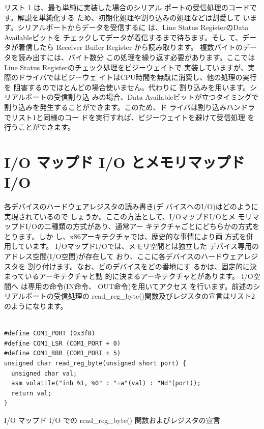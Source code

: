  リスト 1 は、最も単純に実装した場合のシリアル
ポートの受信処理のコードです。解説を単純化する
ため、初期化処理や割り込みの処理などは割愛して
います。シリアルポートからデータを受信するに
は、Line Status RegisterのData Availableビットを
チェックしてデータが着信するまで待ちます。そし
て、データが着信したら Receiver Buffer Register
から読み取ります。
 複数バイトのデータを読み出すには、バイト数分
この処理を繰り返す必要があります。ここではLine
Status Registerのチェック処理をビジーウェイトで
実装していますが、実際のドライバではビジーウェ
イトはCPU時間を無駄に消費し、他の処理の実行を
阻害するのでほとんどの場合使いません。代わりに
割り込みを用います。シリアルポートの受信割り込
みの場合、Data Availableビットが立つタイミングで
割り込みを発生することができます。このため、ド
ライバは割り込みハンドラでリスト1と同様のコー
ドを実行すれば、ビジーウェイトを避けて受信処理
を行うことができます。



\section{I/O マップド I/O とメモリマップド I/O}

 各デバイスのハードウェアレジスタの読み書き(デ
バイスへのI/O)はどのように実現されているので
しょうか。ここの方法として、I/OマップドI/Oとメ
モリマップドI/Oの二種類の方式があり、通常アー
キテクチャごとにどちらかの方式をとります。しか
し、x86アーキテクチャでは、歴史的な事情により両
方式を併用しています。
 I/OマップドI/Oでは、メモリ空間とは独立した
デバイス専用のアドレス空間(I/O空間)が存在して
おり、ここに各デバイスのハードウェアレジスタを
割り付けます。なお、どのデバイスをどの番地にす
るかは、固定的に決まっているアーキテクチャと動
的に決まるアーキテクチャとがあります。 I/O空間へ
は専用の命令(IN命令、 OUT命令)を用いてアクセス
を行います。前述のシリアルポートの受信処理の
read\_reg\_byte()関数及びレジスタの宣言はリスト2
のようになります。

\begin{program}\centering
\begin{verbatim}

#define COM1_PORT (0x3f8)
#define COM1_LSR (COM1_PORT + 0)
#define COM1_RBR (COM1_PORT + 5)
unsigned char read_reg_byte(unsigned short port) {
  unsigned char val;
  asm volatile("inb %1, %0" : "=a"(val) : "Nd"(port));
  return val;
}
\end{verbatim}
\caption{I/O マップド I/O での read\_reg\_byte() 関数およびレジスタの宣言}
\end{program}

